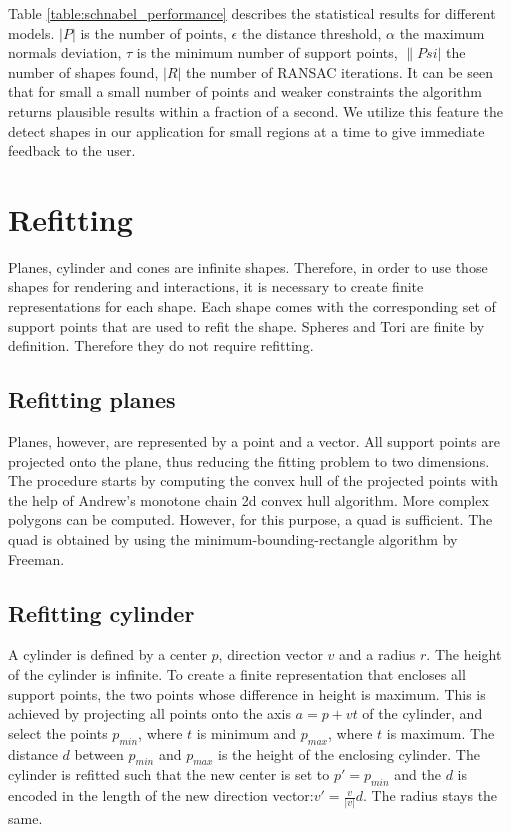 Table \ref{table:schnabel_performance} describes the statistical results for different models. $|P|$ is the number of points, $\epsilon$ the distance threshold, $\alpha$ the maximum normals deviation, $\tau$ is the minimum number of support points, $\|Psi|$ the number of shapes found, $|R|$ the number of RANSAC iterations. It can be seen that for small a small number of points and weaker constraints the algorithm returns plausible results within a fraction of a second. We utilize this feature the detect shapes in our application for small regions at a time to give immediate feedback to the user. 


\section{Refitting}
\label{sec:Refitting}

Planes, cylinder and cones are infinite shapes. Therefore, in order to use those shapes for rendering and interactions, it is necessary to create finite representations for each shape. Each shape comes with the corresponding set of support points that are used to refit the shape. Spheres and Tori are finite by definition. Therefore they do not require refitting. 


\subsection{Refitting planes}

Planes, however, are represented by a point and a vector. All support points are projected onto the plane, thus reducing the fitting problem to two dimensions. The procedure starts by computing the convex hull of the projected points with the help of Andrew's monotone chain 2d convex hull algorithm\cite{andrew1979another}. 
More complex polygons can be computed. However, for this purpose, a quad is sufficient. The quad is obtained by using the minimum-bounding-rectangle algorithm by Freeman\cite{freeman1975determining}. 


\subsection{Refitting cylinder}

A cylinder is defined by a center $p$, direction vector $v$ and a radius $r$. The height of the cylinder is infinite. To create a finite representation that encloses all support points, the two points whose difference in height is maximum. This is achieved by projecting all points onto the axis $a = p + vt$ of the cylinder, and select the points $p_{min}$, where $t$ is minimum and $p_{max}$, where $t$ is maximum. The distance $d$ between $p_{min}$ and $p_{max}$ is the height of the enclosing cylinder. The cylinder is refitted such that the new center is set to $p' = p_{min}$ and the $d$ is encoded in the length of the new direction vector:$v' = \frac{v}{|v|}d$. The radius stays the same. 


